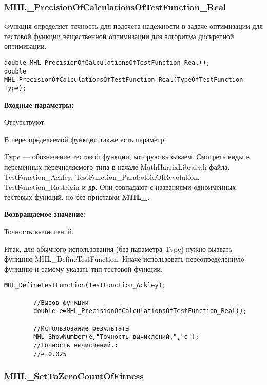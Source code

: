 \documentclass[a4paper,12pt]{article}
\begin{document}
\subsubsection{MHL\_PrecisionOfCalculationsOfTestFunction\_Real}\label{MHL_PrecisionOfCalculationsOfTestFunction_Real}

Функция определяет точность для подсчета надежности в задаче оптимизации для тестовой функции вещественной оптимизации для алгоритма дискретной оптимизации.


\begin{lstlisting}[label=code_syntax_MHL_PrecisionOfCalculationsOfTestFunction_Real,caption=Синтаксис]
double MHL_PrecisionOfCalculationsOfTestFunction_Real();
double MHL_PrecisionOfCalculationsOfTestFunction_Real(TypeOfTestFunction Type);
\end{lstlisting}

\textbf{Входные параметры:}

Отсутствуют.

В переопределяемой функции также есть параметр:
  
Type --- обозначение тестовой функции, которую вызываем.
Смотреть виды в переменных перечисляемого типа в начале MathHarrixLibrary.h файла: TestFunction\_Ackley, TestFunction\_ParaboloidOfRevolution, TestFunction\_Rastrigin и др. Они совпадают с названиями одноименных тестовых функций, но без приставки \textbf{MHL\_}.

\textbf{Возвращаемое значение:}
 
Точность вычислений.

Итак, для обычного использования (без параметра Type) нужно вызвать функцию MHL\_DefineTestFunction. Иначе использовать переопределенную функцию и самому указать тип тестовой функции.


\begin{lstlisting}[label=code_use_MHL_PrecisionOfCalculationsOfTestFunction_Real,caption=Пример использования]
        MHL_DefineTestFunction(TestFunction_Ackley);

        //Вызов функции
        double e=MHL_PrecisionOfCalculationsOfTestFunction_Real();

        //Использование результата
        MHL_ShowNumber(e,"Точность вычислений.","e");
        //Точность вычислений.:
        //e=0.025
\end{lstlisting}

\subsubsection{MHL\_SetToZeroCountOfFitness}\label{MHL_SetToZeroCountOfFitness}
\end{document}
